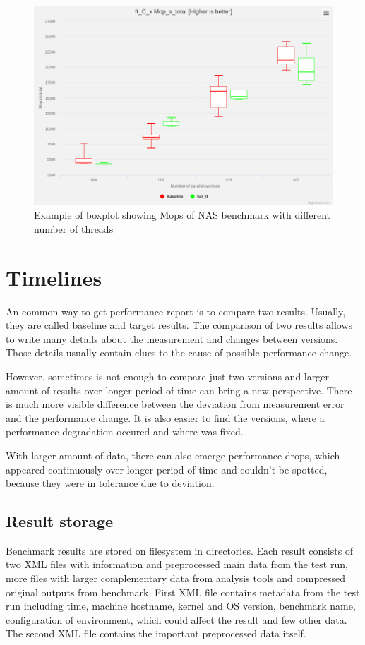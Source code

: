 \begin{figure}
  \centering
  \includegraphics[width=12cm]{obrazky-figures/boxplot}
  \caption{Example of boxplot showing Mops of NAS benchmark with different
    number of threads}
\end{figure}


\chapter{Timelines}
An common way to get performance report is to compare two results. Usually, they
are called baseline and target results. The comparison of two results allows to
write many details about the measurement and changes between versions. Those
details usually contain clues to the cause of possible performance change.

However, sometimes is not enough to compare just two versions and larger amount
of results over longer period of time can bring a new perspective. There is much
more visible difference between the deviation from measurement error and the
performance change. It is also easier to find the versions, where a
performance degradation occured and where was fixed.

With larger amount of data, there can also emerge performance drops, which
appeared continuously over longer period of time and couldn't be spotted,
because they were in tolerance due to deviation.

\section{Result storage}
Benchmark results are stored on filesystem in directories. Each result consists
of two XML files with information and preprocessed main data from the test run,
more files with larger complementary data from analysis tools and compressed
original outputs from benchmark. First XML file contains metadata from the test
run including time, machine hostname, kernel and OS version, benchmark name,
configuration of environment, which could affect the result and few other data.
The second XML file contains the important preprocessed data itself.

